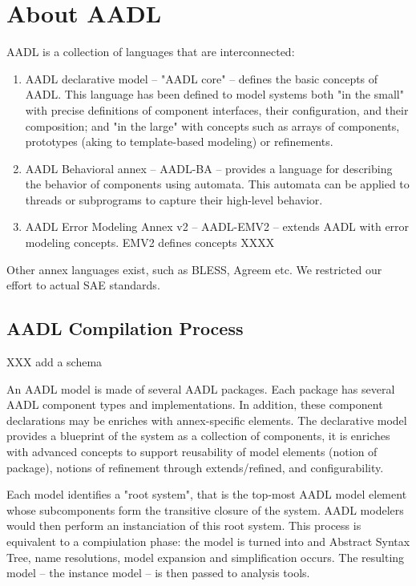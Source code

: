 
\section{About AADL}

AADL is a collection of languages that are interconnected:

\begin{enumerate}
    \item AADL declarative model -- "AADL core" -- defines the basic concepts of AADL. This language has been defined to model systems both "in the small" with precise definitions of component interfaces, their configuration, and their composition; and "in the large" with concepts such as arrays of components, prototypes (aking to template-based modeling) or refinements.
    \item AADL Behavioral annex -- AADL-BA -- provides a language for describing the behavior of components using automata. This automata can be applied to threads or subprograms to capture their high-level behavior.
    \item AADL Error Modeling Annex v2 -- AADL-EMV2 -- extends AADL with error modeling concepts. EMV2 defines concepts XXXX
\end{enumerate}

Other annex languages exist, such as BLESS, Agreem etc. We restricted our effort to actual SAE standards.

\subsection{AADL Compilation Process}

XXX add a schema

An AADL model is made of several AADL packages. Each package has several AADL component types and implementations. In addition, these component declarations may be enriches with annex-specific elements. The declarative model provides a blueprint of the system as a collection of components, it is enriches with advanced concepts to support reusability of model elements (notion of package), notions of refinement through extends/refined, and configurability.

Each model identifies a "root system", that is the top-most AADL model element whose subcomponents form the transitive closure of the system. AADL modelers would then perform an instanciation of this root system. This process is equivalent to a compiulation phase: the model is turned into and Abstract Syntax Tree, name resolutions, model expansion and simplification occurs. The resulting model -- the instance model -- is then passed to analysis tools.

